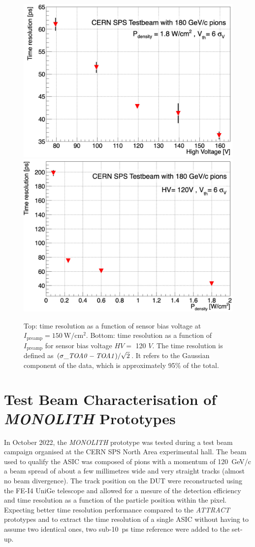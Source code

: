 		\vspace{5pt}
		\begin{figure}[h]
			\centering %
			\includegraphics[width=.65\textwidth,trim=0 0 0 0, clip]{files/ATTRACT_paper/timeres_vs_HV}
			\vspace{10pt}
			\includegraphics[width=.65\textwidth,trim=0 0 0 0, clip]{files/ATTRACT_paper/timeres_vs_power}
			\caption{Top: time resolution as a function of sensor bias voltage at $ I_{\text{preamp}} = \SI{150}{\watt/\centi\meter^2}$. Bottom: time resolution as a function of $I_{\text{preamp}} $ for sensor bias voltage $HV = $ 120 $V$. The time resolution is defined as $(\sigma\_{\it TOA0-TOA1})/\sqrt{2}$. It refers to the Gaussian component of the data, which is approximately 95\% of the total.}
			\label{im:ATTRACT_TOFHV} 
		\end{figure}
		
	
	\clearpage
	\section{Test Beam Characterisation of \textit{MONOLITH} Prototypes}
	In October 2022, the \textit{MONOLITH} prototype was tested during a test beam campaign organised at the CERN SPS North Area experimental hall. The beam used to qualify the ASIC was composed of pions with a momentum of \SI{120}{\giga\electronvolt}/c a beam spread of about a few millimetres wide and very straight tracks (almost no beam divergence). The track position on the DUT were reconstructed using the FE-I4 UniGe telescope \cite{telescope} and allowed for a mesure of the detection efficiency and time resolution as a function of the particle position within the pixel. Expecting better time resolution performance compared to the \textit{ATTRACT} prototypes and to extract the time resolution of a single ASIC without having to assume two identical ones, two sub-\SI{10}{\pico\second} time reference were added to the set-up.  
		

